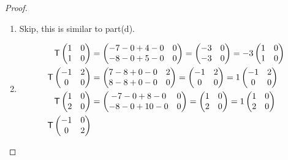 \begin{proof}
\begin{enumerate}
\item Skip, this is similar to part(d).

\item
\begin{align*}
    \T \begin{pmatrix} 1 & 0 \\ 1 & 0 \end{pmatrix}
        & = \begin{pmatrix} -7 - 0 + 4 - 0 & 0 \\ -8 - 0 + 5 - 0 & 0 \end{pmatrix}
          = \begin{pmatrix} -3 & 0 \\ -3 & 0 \end{pmatrix} = -3 \begin{pmatrix} 1 & 0 \\ 1 & 0 \end{pmatrix} \\
    \T \begin{pmatrix} -1 & 2 \\ 0 & 0 \end{pmatrix}
        & = \begin{pmatrix} 7 - 8 + 0 - 0 & 2 \\ 8 - 8 + 0 - 0 & 0 \end{pmatrix}
          = \begin{pmatrix} -1 & 2 \\ 0 & 0 \end{pmatrix} = 1 \begin{pmatrix} -1 & 2 \\ 0 & 0 \end{pmatrix} \\
    \T \begin{pmatrix} 1 & 0 \\ 2 & 0 \end{pmatrix}
        & = \begin{pmatrix} -7 - 0 + 8 - 0 & 0 \\ -8 - 0 + 10 - 0 & 0 \end{pmatrix}
          = \begin{pmatrix} 1 & 0 \\ 2 & 0 \end{pmatrix} = 1 \begin{pmatrix} 1 & 0 \\ 2 & 0 \end{pmatrix} \\
    \T \begin{pmatrix} -1 & 0 \\ 0 & 2 \end{pmatrix}

\end{align*}
\end{enumerate}
\end{proof}

